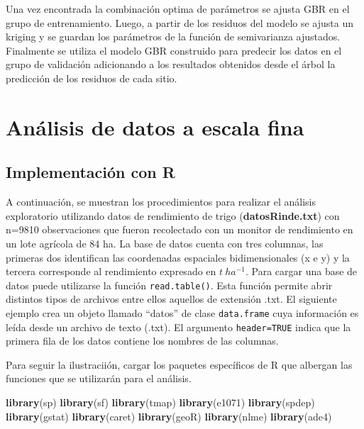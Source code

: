 \documentclass[11pt,b5paper,]{krantz}
\newenvironment{Shaded}{}{}
\newcommand{\KeywordTok}[1]{\textcolor[rgb]{0.00,0.44,0.13}{\textbf{#1}}}
\newcommand{\NormalTok}[1]{#1}
\begin{document}
Una vez encontrada la combinación optima de parámetros se ajusta GBR en
el grupo de entrenamiento. Luego, a partir de los residuos del modelo se
ajusta un kriging y se guardan los parámetros de la función de
semivarianza ajustados. Finalmente se utiliza el modelo GBR construido
para predecir los datos en el grupo de validación adicionando a los
resultados obtenidos desde el árbol la predicción de los residuos de
cada sitio.

\cleardoublepage 

\part{Análisis de datos a escala
fina}\label{part-anuxe1lisis-de-datos-a-escala-fina}

\setcounter{chapter}{0}

\chapter{Implementación con R}\label{implementaciuxf3n-con-r}

A continuación, se muestran los procedimientos para realizar el análisis
exploratorio utilizando datos de rendimiento de trigo
(\textbf{datosRinde.txt}) con n=9810 observaciones que fueron
recolectado con un monitor de rendimiento en un lote agrícola de 84 ha.
La base de datos cuenta con tres columnas, las primeras dos identifican
las coordenadas espaciales bidimensionales (x e y) y la tercera
corresponde al rendimiento expresado en \(t\ ha^{-1}\). Para cargar una
base de datos puede utilizarse la función \texttt{read.table()}. Esta
función permite abrir distintos tipos de archivos entre ellos aquellos
de extensión .txt. El siguiente ejemplo crea un objeto llamado ``datos''
de clase \texttt{data.frame} cuya información es leída desde un archivo
de texto (.txt). El argumento \texttt{header=TRUE} indica que la primera
fila de los datos contiene los nombres de las columnas.

Para seguir la ilustraciión, cargar los paquetes específicos de R que
albergan las funciones que se utilizarán para el análisis.

\begin{Shaded}
\begin{Highlighting}[]
\KeywordTok{library}\NormalTok{(sp)}
\KeywordTok{library}\NormalTok{(sf)}
\KeywordTok{library}\NormalTok{(tmap)}
\KeywordTok{library}\NormalTok{(e1071)}
\KeywordTok{library}\NormalTok{(spdep)}
\KeywordTok{library}\NormalTok{(gstat)}
\KeywordTok{library}\NormalTok{(caret)}
\KeywordTok{library}\NormalTok{(geoR)}
\KeywordTok{library}\NormalTok{(nlme)}
\KeywordTok{library}\NormalTok{(ade4)}
\end{Highlighting}
\end{Shaded}
\end{document}
